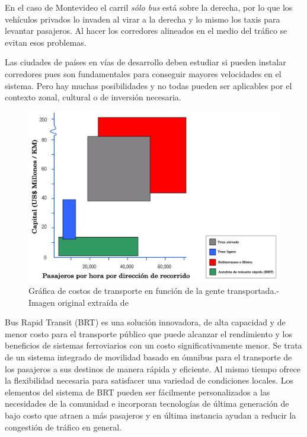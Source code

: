 En el caso de Montevideo el carril \emph{sólo bus} está sobre la derecha, por lo que los vehículos privados lo invaden al virar a la derecha y lo mismo los taxis para levantar pasajeros. Al hacer los corredores alineados en el medio del tráfico se evitan esos problemas.  

Las ciudades de países en vías de desarrollo deben estudiar si pueden instalar corredores pues son fundamentales para conseguir mayores velocidades en el sistema. Pero hay muchas posibilidades y no todas pueden ser aplicables por el contexto zonal, cultural o de inversión necesaria.

\begin{figure}[H]
	\centering
	\includegraphics[width=0.9\linewidth]{Figures/costo_transporte}
	\caption[Gráfica de costos de transporte en función de la gente transportada.]{Gráfica de costos de transporte en función de la gente transportada.- Imagen original extraída de \citep{ITDP}		
	}
	\label{fig:Grafica de costos de otros medios de transporte}
\end{figure}

Bus Rapid Transit (BRT) es una solución innovadora, de alta capacidad y de menor costo para el transporte público que puede alcanzar el rendimiento y los beneficios de sistemas ferroviarios con un costo significativamente menor. Se trata de un sistema integrado de movilidad basado en ómnibus para el transporte de los pasajeros a sus destinos de manera rápida y eficiente. Al mismo tiempo ofrece la flexibilidad necesaria para satisfacer una variedad de condiciones locales. Los elementos del sistema de BRT pueden ser fácilmente personalizados a las necesidades de la comunidad e incorporan tecnologías de última generación de bajo costo que atraen a más pasajeros y en última instancia ayudan a reducir la congestión de tráfico en general.

